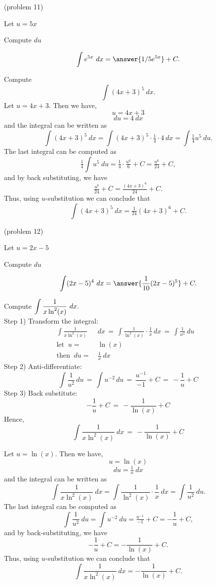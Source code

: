 \documentclass[handout]{ximera}
\begin{document}
\begin{problem}(problem 11)
\begin{hint}
Let $u = 5x$
\end{hint}
\begin{hint}
Compute $du$
\end{hint}
\[\int e^{5x} \ dx = \answer{1/5 e^{5x}} +C.\]
\end{problem}


\begin{example}[example 12] Compute 
\[\int (4x+3)^5 \ dx.\]
Let $u = 4x+3$. Then we have,
\[u = 4x+3\]
\[du = 4 \ dx\]
and the integral can be written as 
\[\int (4x+3)^5 \ dx =   \int (4x+3)^5 \cdot \tfrac14\cdot 4  \   dx =   \int \tfrac14 u^5 \ du.\]
The last integral can be computed as 
\[\tfrac14  \int u^5 \ du = \tfrac14  \cdot \tfrac{u^6}{6} + C = \tfrac{u^6}{24} + C,\]
and by back substituting, we have 
\[\tfrac{u^6}{24} + C = \tfrac{(4x+3)^6}{24}+ C.\]
Thus, using $u$-substitution we can conclude that
\[\int (4x+3)^5 \ dx = \tfrac{1}{24}(4x+3)^6 + C.\]
\end{example}




\begin{problem}(problem 12)
\begin{hint}
Let $u = 2x - 5$
\end{hint}
\begin{hint}
Compute $du$
\end{hint}
\[\int (2x - 5)^4 \ dx = \answer{\frac{1}{10}(2x-5)^5} +C.\]
\end{problem}


\begin{example}[example 13]
 Compute $\dis \int \frac{1}{x\ln^2(x)} \ dx.$\\
Step 1) Transform the integral:
\begin{align*}
\int \frac{1}{x\ln^2(x)}& \ dx \, = \, \int \frac{1}{\ln^2(x)} \cdot \frac{1}{x} \, dx\,  = \, \int \frac{1}{u^2} \ du\\
\text{let} \;\; u = & \ \ln(x)&  \\
\text{then} \;\; du = & \ \frac{1}{x} \ dx&
\end{align*}
Step 2) Anti-differentiate:
\[
\int \frac{1}{u^2} \, du \, = \, \int u^{-2} \, du\, =\, \frac{u^{-1}}{-1} + C\, =\, -\frac{1}{u} + C
\]
Step 3) Back substitute:
\[
-\frac{1}{u} + C \, =\, -\frac{1}{\ln(x)} + C
\]
Hence,
\[
\int \frac{1}{x\ln^2(x)} \ dx \,= \,-\frac{1}{\ln(x)} + C
\]

Let $u = \ln(x)$. Then we have,
\[u = \ln(x)\]
\[du = \tfrac1x \ dx\]
and the integral can be written as 
\[\int \frac{1}{x\ln^2(x)} \ dx = \int \frac{1}{\ln^2(x)} \cdot \frac{1}{x}\  dx = \int \frac{1}{u^2} \ du.\]
The last integral can be computed as 
\[\int \frac{1}{u^2} \ du = \int u^{-2} \ du = \tfrac{u^{-1}}{-1} + C 
= -\frac{1}{u} + C,\]
and by back-substituting, we have 
\[-\frac{1}{u} + C =  -\frac{1}{\ln(x)} + C.\]
Thus, using $u$-substitution we can conclude that
\[\int \frac{1}{x\ln^2(x)} \ dx =  -\frac{1}{\ln(x)} + C.\]
\end{example}
\end{document}
